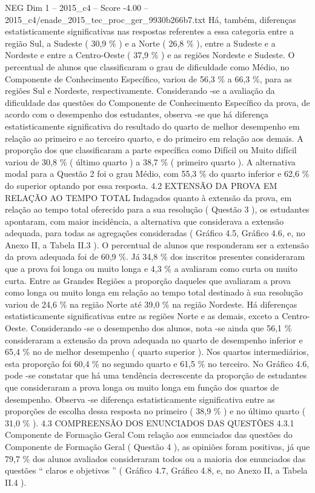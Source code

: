 \begin{textsample}{NEG Dim 1 – 2015\_c4 – Score -4.00 – 2015\_c4/enade\_2015\_tec\_proc\_ger\_9930b266b7.txt}
Há, também, diferenças estatisticamente significativas nas respostas referentes a essa categoria entre a região Sul, a Sudeste ( 30,9 \% ) e a Norte ( 26,8 \% ), entre a Sudeste e a Nordeste e entre a Centro-Oeste ( 37,9 \% ) e as regiões Nordeste e Sudeste.
O percentual de alunos que classificaram o grau de dificuldade como Médio, no Componente de Conhecimento Específico, variou de 56,3 \% a 66,3 \%, para as regiões Sul e Nordeste, respectivamente.
Considerando -se a avaliação da dificuldade das questões do Componente de Conhecimento Específico da prova, de acordo com o desempenho dos estudantes, observa -se que há diferença estatisticamente significativa do resultado do quarto de melhor desempenho em relação ao primeiro e ao terceiro quarto, e do primeiro em relação aos demais.
A proporção dos que classificaram a parte específica como Difícil ou Muito difícil variou de 30,8 \% ( último quarto ) a 38,7 \% ( primeiro quarto ).
A alternativa modal para a Questão 2 foi o grau Médio, com 55,3 \% do quarto inferior e 62,6 \% do superior optando por essa resposta. 4.2 EXTENSÃO DA PROVA EM RELAÇÃO AO TEMPO TOTAL Indagados quanto à extensão da prova, em relação ao tempo total oferecido para a sua resolução ( Questão 3 ), os estudantes apontaram, com maior incidência, a alternativa que considerava a extensão adequada, para todas as agregações consideradas ( Gráfico 4.5, Gráfico 4.6, e, no Anexo II, a Tabela II.3 ).
O percentual de alunos que responderam ser a extensão da prova adequada foi de 60,9 \%.
Já 34,8 \% dos inscritos presentes consideraram que a prova foi longa ou muito longa e 4,3 \% a avaliaram como curta ou muito curta.
Entre as Grandes Regiões a proporção daqueles que avaliaram a prova como longa ou muito longa em relação ao tempo total destinado à sua resolução variou de 24,6 \% na região Norte até 39,0 \% na região Nordeste.
Há diferenças estatisticamente significativas entre as regiões Norte e as demais, exceto a Centro-Oeste.
Considerando -se o desempenho dos alunos, nota -se ainda que 56,1 \% consideraram a extensão da prova adequada no quarto de desempenho inferior e 65,4 \% no de melhor desempenho ( quarto superior ).
Nos quartos intermediários, esta proporção foi 60,4 \% no segundo quarto e 61,5 \% no terceiro.
No Gráfico 4.6, pode -se constatar que há uma tendência decrescente da proporção de estudantes que consideraram a prova longa ou muito longa em função dos quartos de desempenho.
Observa -se diferença estatisticamente significativa entre as proporções de escolha dessa resposta no primeiro ( 38,9 \% ) e no último quarto ( 31,0 \% ). 4.3 COMPREENSÃO DOS ENUNCIADOS DAS QUESTÕES 4.3.1 Componente de Formação Geral Com relação aos enunciados das questões do Componente de Formação Geral ( Questão 4 ), as opiniões foram positivas, já que 79,7 \% dos alunos avaliados consideraram todos ou a maioria dos enunciados das questões “ claros e objetivos ” ( Gráfico 4.7, Gráfico 4.8, e, no Anexo II, a Tabela II.4 ).

\end{textsample}
